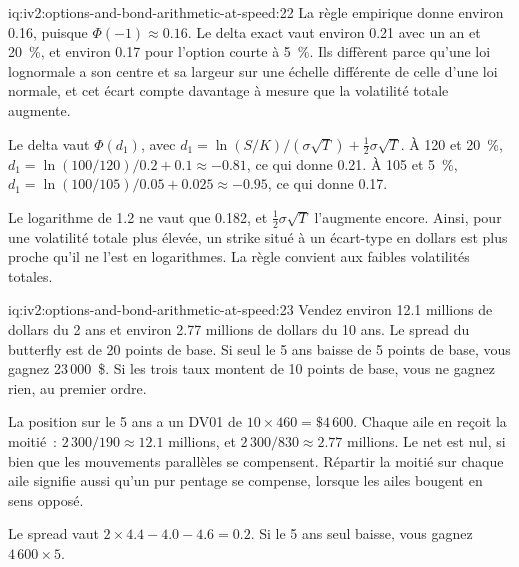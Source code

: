 \begin{solution}{iq:iv2:options-and-bond-arithmetic-at-speed:22}
La règle empirique donne environ 0.16, puisque $\Phi(-1) \approx 0.16$. Le delta exact vaut environ 0.21 avec un an et 20~\%, et environ 0.17 pour l'option courte à 5~\%. Ils diffèrent parce qu'une loi lognormale a son centre et sa largeur sur une échelle différente de celle d'une loi normale, et cet écart compte davantage à mesure que la volatilité totale augmente.

Le delta vaut $\Phi(d_1)$, avec $d_1 = \ln(S/K)/(\sigma\sqrt T) + \tfrac12\sigma\sqrt T$. À 120 et 20~\%, $d_1 = \ln(100/120)/0.2 + 0.1 \approx -0.81$, ce qui donne 0.21. À 105 et 5~\%, $d_1 = \ln(100/105)/0.05 + 0.025 \approx -0.95$, ce qui donne 0.17.

Le logarithme de 1.2 ne vaut que 0.182, et $\tfrac12\sigma\sqrt T$ l'augmente encore. Ainsi, pour une volatilité totale plus élevée, un strike situé à un écart-type en dollars est plus proche qu'il ne l'est en logarithmes. La règle convient aux faibles volatilités totales.

\end{solution}

\begin{solution}{iq:iv2:options-and-bond-arithmetic-at-speed:23}
Vendez environ 12.1 millions de dollars du 2 ans et environ 2.77 millions de dollars du 10 ans. Le spread du butterfly est de 20 points de base. Si seul le 5 ans baisse de 5 points de base, vous gagnez 23\,000~\$. Si les trois taux montent de 10 points de base, vous ne gagnez rien, au premier ordre.

La position sur le 5 ans a un DV01 de $10 \times 460 = \$4\,600$. Chaque aile en reçoit la moitié~: $2\,300/190 \approx 12.1$ millions, et $2\,300/830 \approx 2.77$ millions. Le net est nul, si bien que les mouvements parallèles se compensent. Répartir la moitié sur chaque aile signifie aussi qu'un pur pentage se compense, lorsque les ailes bougent en sens opposé.

Le spread vaut $2 \times 4.4 - 4.0 - 4.6 = 0.2$. Si le 5 ans seul baisse, vous gagnez $4\,600 \times 5$.

\end{solution}

